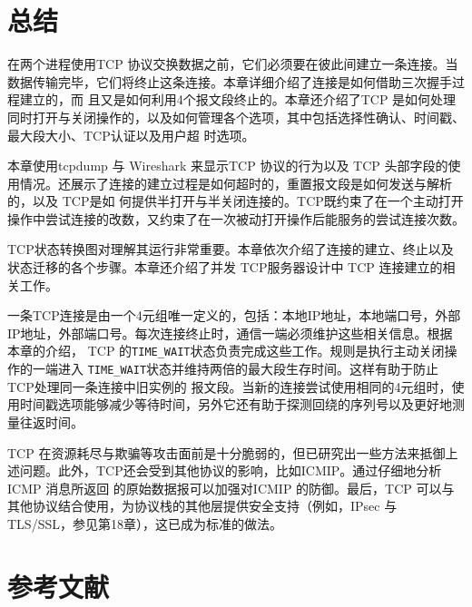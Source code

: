 \section{总结}
在两个进程使用TCP 协议交换数据之前，它们必须要在彼此间建立一条连接。当数据传输完毕，它们将终止这条连接。本章详细介绍了连接是如何借助三次握手过程建立的，而
且又是如何利用4个报文段终止的。本章还介绍了TCP 是如何处理同时打开与关闭操作的，以及如何管理各个选项，其中包括选择性确认、时间戳、最大段大小、TCP认证以及用户超
时选项。

本章使用tcpdump 与 Wireshark 来显示TCP 协议的行为以及 TCP 头部字段的使用情况。还展示了连接的建立过程是如何超时的，重置报文段是如何发送与解析的，以及 TCP是如
何提供半打开与半关闭连接的。TCP既约束了在一个主动打开操作中尝试连接的改数，又约束了在一次被动打开操作后能服务的尝试连接次数。

TCP状态转换图对理解其运行非常重要。本章依次介绍了连接的建立、终止以及状态迁移的各个步骤。本章还介绍了并发 TCP服务器设计中 TCP 连接建立的相关工作。

一条TCP连接是由一个4元组唯一定义的，包括：本地IP地址，本地端口号，外部IP地址，外部端口号。每次连接终止时，通信一端必须维护这些相关信息。根据本章的介绍，
TCP 的\verb|TIME_WAIT|状态负责完成这些工作。规则是执行主动关闭操作的一端进入 \verb|TIME_WAIT|状态并维持两倍的最大段生存时间。这样有助于防止 TCP处理同一条连接中旧实例的
报文段。当新的连接尝试使用相同的4元组时，使用时间戳选项能够减少等待时间，另外它还有助于探测回绕的序列号以及更好地测量往返时间。

TCP 在资源耗尽与欺骗等攻击面前是十分脆弱的，但已研究出一些方法来抵御上述问题。此外，TCP还会受到其他协议的影响，比如ICMIP。通过仔细地分析ICMP 消息所返回
的原始数据报可以加强对ICMIP 的防御。最后，TCP 可以与其他协议结合使用，为协议栈的其他层提供安全支持（例如，IPsec 与 TLS/SSL，参见第18章），这已成为标准的做法。
\section{参考文献}